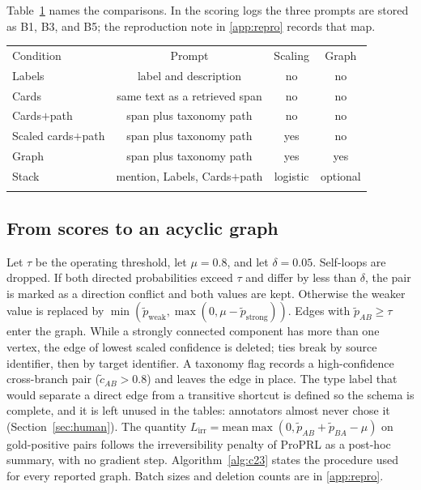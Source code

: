 \documentclass{ws-ijait}
\newcommand{\Lirr}{L_{\mathrm{irr}}}
\begin{document}
Table~\ref{tab:cond} names the comparisons.
In the scoring logs the three prompts are stored as B1, B3, and B5;
the reproduction note in \ref{app:repro} records that map.

\begin{table}[th]
{\begin{tabular}{@{}lccc@{}}
\toprule
Condition & Prompt & Scaling & Graph \\
\colrule
Labels & label and description & no & no \\
Cards & same text as a retrieved span & no & no \\
Cards$+$path & span plus taxonomy path & no & no \\
Scaled cards$+$path & span plus taxonomy path & yes & no \\
Graph & span plus taxonomy path & yes & yes \\
Stack & mention, Labels, Cards$+$path & logistic & optional \\
\botrule
\end{tabular}}
\label{tab:cond}
\end{table}

\subsection{From scores to an acyclic graph}
\label{sec:alg}
Let $\tau$ be the operating threshold, let $\mu=0.8$, and let
$\delta=0.05$.
Self-loops are dropped.
If both directed probabilities exceed $\tau$ and differ by less
than $\delta$, the pair is marked as a direction conflict and both
values are kept.
Otherwise the weaker value is replaced by
$\min(\tilde{p}_{\mathrm{weak}},\max(0,\mu-\tilde{p}_{\mathrm{strong}}))$.
Edges with $\tilde{p}_{AB}\ge\tau$ enter the graph.
While a strongly connected component has more than one vertex, the
edge of lowest scaled confidence is deleted; ties break by source
identifier, then by target identifier.
A taxonomy flag records a high-confidence cross-branch pair
($\tilde{c}_{AB}>0.8$) and leaves the edge in place.
The type label that would separate a direct edge from a transitive
shortcut is defined so the schema is complete, and it is left unused
in the tables: annotators almost never chose it
(Section~\ref{sec:human}).
The quantity $\Lirr=\mathrm{mean}\max(0,\tilde{p}_{AB}+\tilde{p}_{BA}-\mu)$
on gold-positive pairs follows the irreversibility penalty of
{ProPRL}\cite{Cheng_2026} as a post-hoc summary, with no gradient
step.
Algorithm~\ref{alg:c23} states the procedure used for every reported
graph.
Batch sizes and deletion counts are in \ref{app:repro}.
\end{document}
